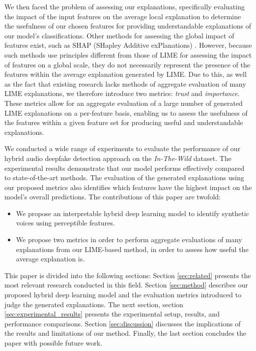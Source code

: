 \documentclass{article}
\begin{document}
We then faced the problem of assessing our explanations, specifically evaluating the impact of the input features on the average local explanation to determine the usefulness of our chosen features for providing understandable explanations of our model's classifications. Other methods for assessing the global impact of features exist, such as SHAP (SHapley Additive exPlanations) \cite{lundberg2017unified}. However, because such methods use principles different from those of LIME for assessing the impact of features on a global scale, they do not necessarily represent the presence of the features within the average explanation generated by LIME. Due to this, as well as the fact that existing research lacks methods of aggregate evaluation of many LIME explanations, we therefore introduce two metrics: \textit{trust} and \textit{importance}. These metrics allow for an aggregate evaluation of a large number of generated LIME explanations on a per-feature basis, enabling us to assess the usefulness of the features within a given feature set for producing useful and understandable explanations.

We conducted a wide range of experiments to evaluate the performance of our hybrid audio deepfake detection approach on the \textit{In-The-Wild} dataset. The experimental results demonstrate that our model performs effectively compared to state-of-the-art methods. The evaluation of the generated explanations using our proposed metrics also identifies which features have the highest impact on the model's overall predictions. The contributions of this paper are twofold:
\begin{itemize}
\item We propose an interpretable hybrid deep learning model to identify synthetic voices using perceptible features.
\item We propose two metrics in order to perform aggregate evaluations of many explanations from our LIME-based method, in order to assess how useful the average explanation is.
\end{itemize}

This paper is divided into the following sections: Section \ref{sec:related} presents the most relevant research conducted in this field. Section \ref{sec:method} describes our proposed hybrid deep learning model and the evaluation metrics introduced to judge the generated explanations. The next section, section \ref{sec:experimental_results} presents the experimental setup, results, and performance comparisons. Section \ref{sec:discussion} discusses the implications of the results and limitations of our method. Finally, the last section concludes the paper with possible future work.
\end{document}

